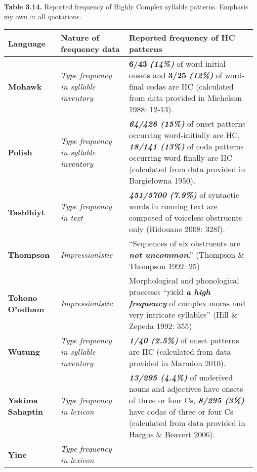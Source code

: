 \documentclass[12pt]{article}
\newenvironment{styleBody}{\renewcommand\baselinestretch{1.0}\setlength\leftskip{0in}\setlength\rightskip{0in plus 1fil}\setlength\parindent{0in}\setlength\parfillskip{0pt plus 1fil}\setlength\parskip{0in plus 1pt}\writerlistparindent\writerlistleftskip\leavevmode\normalfont\normalsize\fontsize{11pt}{13.2pt}\selectfont\mdseries\upshape\writerlistlabel\ignorespaces}{\unskip\vspace{0in plus 1pt}\par}
\newcommand\writerlistleftskip{}
\newcommand\writerlistparindent{}
\newcommand\writerlistlabel{}
\begin{document}
\begin{styleBody}
\textbf{Table 3.14.} Reported frequency of Highly Complex syllable patterns. Emphasis my own in all quotations.
\end{styleBody}

\begin{flushleft}
\tablefirsthead{}
\tablehead{}
\tabletail{}
\tablelasttail{}
\begin{supertabular}{m{0.77125984in}m{1.0900599in}m{4.32406in}}
\hline
{\bfseries Language} &
{\bfseries Nature of frequency data} &
{\bfseries Reported frequency of HC patterns}\\\hline
{\bfseries Mohawk} &
{\itshape Type frequency in syllable inventory} &
{\fontsize{10pt}{12.0pt}\selectfont\mdseries\upshape \textbf{6/43 }\textbf{\textit{(14\%)}} of word-initial onsets and\textbf{ 3/25 }\textbf{\textit{(12\%)}} of word-final codas are HC (calculated from data provided in Michelson 1988: 12-13).}\\\hline
{\bfseries Polish} &
{\itshape Type frequency in syllable inventory} &
{\fontsize{10pt}{12.0pt}\selectfont\mdseries\upshape \textbf{\textit{64/426 (15\%)}} of onset patterns occurring word-initially are HC,\textbf{\textit{ 18/141 (13\%)}} of coda patterns occurring word-finally are HC (calculated from data provided in Bargiełowna 1950).}\\\hline
{\bfseries Tashlhiyt} &
{\itshape Type frequency in text} &
{\fontsize{10pt}{12.0pt}\selectfont\mdseries\upshape \textbf{\textit{451/5700 (7.9\%)}} of syntactic words in running text are composed of voiceless obstruents only (Ridouane 2008: 328f).}\\\hline
{\bfseries Thompson} &
{\itshape Impressionistic} &
{\fontsize{10pt}{12.0pt}\selectfont\mdseries\upshape “Sequences of six obstruents are\textbf{\textit{ not uncommon}}.” (Thompson \& Thompson 1992: 25)}\\\hline
{\bfseries Tohono O’odham} &
{\itshape Impressionistic} &
{\fontsize{10pt}{12.0pt}\selectfont\mdseries\upshape Morphological and phonological processes “yield \textbf{\textit{a high frequency}} of complex moras and very intricate syllables” (Hill \& Zepeda 1992: 355)}\\\hline
{\bfseries Wutung} &
{\itshape Type frequency in syllable inventory} &
{\fontsize{10pt}{12.0pt}\selectfont\mdseries\upshape \textbf{\textit{1/40 (2.5\%) }}of\textbf{\textit{ }}onset patterns are HC (calculated from data provided in Marmion 2010).}\\\hline
{\bfseries Yakima Sahaptin} &
{\itshape Type frequency in lexicon} &
{\fontsize{10pt}{12.0pt}\selectfont\mdseries\upshape \textbf{\textit{13/295 (4.4\%)}}\textit{ }of underived nouns and adjectives have onsets of three or four Cs, \textbf{\textit{8/295 (3\%)}} have codas of three or four Cs (calculated from data provided in Hargus \& Beavert 2006).}\\\hline
{\bfseries Yine} &
{\itshape Type frequency in lexicon}


\end{supertabular}
\end{flushleft}
\end{document}
